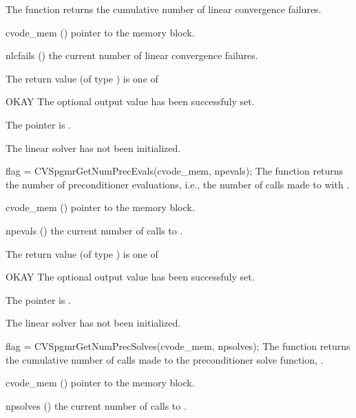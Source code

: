 {
  The function  returns the
  cumulative number of linear convergence failures.
}
{
  \begin{args}
  \item[cvode\_mem] ()
    pointer to the {\cvode} memory block.
  \item[nlcfails] ()
    the current number of linear convergence failures.
  \end{args}
}
{
  The return value  (of type ) is one of
  \begin{args}
  \item[OKAY] 
    The optional output value has been successfuly set.
  \item[\Id{LIN\_NO\_MEM}]
    The  pointer is .
  \item[\Id{LIN\_NO\_LMEM}]
    The {\cvspgmr} linear solver has not been initialized.
  \end{args}
}
{}
{
  flag = CVSpgmrGetNumPrecEvals(cvode\_mem, npevals);
}
{
  The function  returns the
  number of preconditioner evaluations, i.e., the number of 
  calls made to  with .
}
{
  \begin{args}
  \item[cvode\_mem] ()
    pointer to the {\cvode} memory block.
  \item[npevals] ()
    the current number of calls to .
  \end{args}
}
{
  The return value  (of type ) is one of
  \begin{args}
  \item[OKAY] 
    The optional output value has been successfuly set.
  \item[\Id{LIN\_NO\_MEM}]
    The  pointer is .
  \item[\Id{LIN\_NO\_LMEM}]
    The {\cvspgmr} linear solver has not been initialized.
  \end{args}
}
{}
{
  flag = CVSpgmrGetNumPrecSolves(cvode\_mem, npsolves);
}
{
  The function  returns the
  cumulative number of calls made to the preconditioner 
  solve function, .
}
{
  \begin{args}
  \item[cvode\_mem] ()
    pointer to the {\cvode} memory block.
  \item[npsolves] ()
    the current number of calls to .
  \end{args}
}
